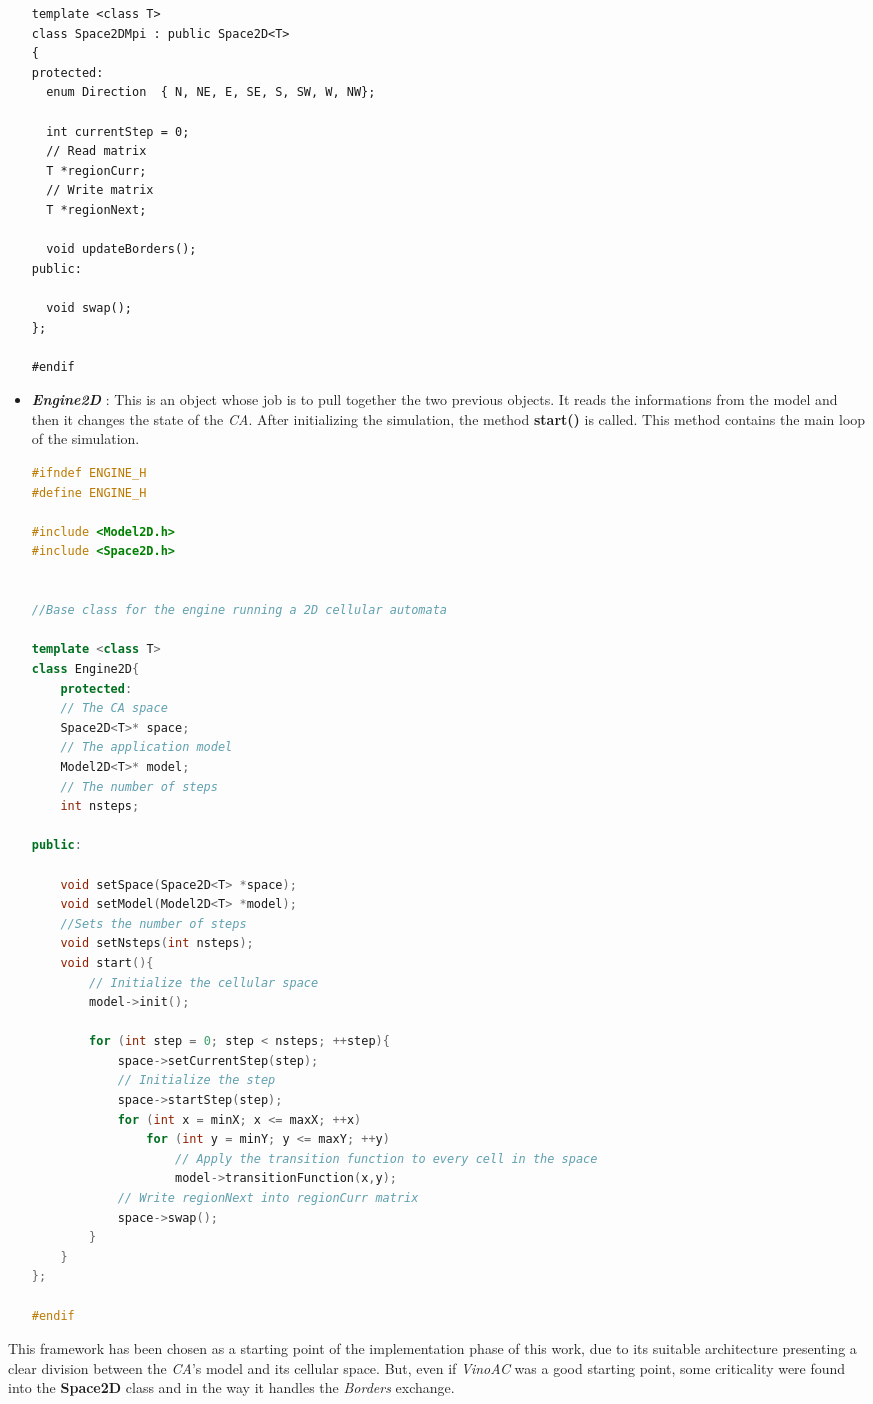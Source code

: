 \documentclass[12pt,a4paper,fleqn]{report}
\begin{document}
\begin{itemize}
\begin{lstlisting}
template <class T>
class Space2DMpi : public Space2D<T>
{
protected:
  enum Direction  { N, NE, E, SE, S, SW, W, NW};

  int currentStep = 0;
  // Read matrix
  T *regionCurr; 
  // Write matrix
  T *regionNext; 
  
  void updateBorders();
public:

  void swap();
};

#endif
\end{lstlisting}

\item
\textit{\textbf{Engine2D}} : This is an object whose job is to pull together the two previous objects. It reads the informations from the model and then it changes the state of the \textit{CA}. After initializing the simulation, the method \textbf{start()} is called. This method contains the main loop of the simulation. 
\begin{lstlisting}[language=C++,
                   directivestyle={\color{black}},
                   emph={int,char,double,float,unsigned},
                   emphstyle={\color{blue}},
                   caption={Engine2D.h, The engine running the simulation and the main loop method},
                   captionpos=b
                  ]
#ifndef ENGINE_H
#define ENGINE_H

#include <Model2D.h>
#include <Space2D.h>


//Base class for the engine running a 2D cellular automata

template <class T>
class Engine2D{
    protected:
    // The CA space
    Space2D<T>* space;
    // The application model
    Model2D<T>* model;
    // The number of steps
    int nsteps;
    
public:

    void setSpace(Space2D<T> *space);
    void setModel(Model2D<T> *model);
    //Sets the number of steps
    void setNsteps(int nsteps);    
    void start(){
    	// Initialize the cellular space
    	model->init(); 
    
    	for (int step = 0; step < nsteps; ++step){
			space->setCurrentStep(step);
			// Initialize the step
			space->startStep(step); 
			for (int x = minX; x <= maxX; ++x)
				for (int y = minY; y <= maxY; ++y)
					// Apply the transition function to every cell in the space
					model->transitionFunction(x,y);
			// Write regionNext into regionCurr matrix
			space->swap();
		}
    }
};

#endif
\end{lstlisting}
\end{itemize}
This framework has been chosen as a starting point of the implementation phase of this work, due to its suitable architecture presenting a clear division between the \textit{CA}'s model and its cellular space. But, even if \textit{VinoAC} was a good starting point, some criticality were found into the \textbf{Space2D} class and in the way it handles the \textit{Borders} exchange.
\end{document}
